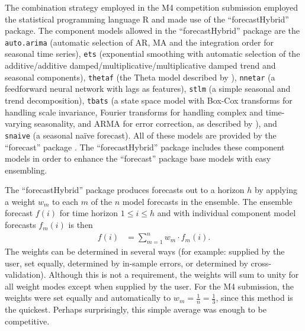\documentclass[11pt,3p,review,authoryear]{elsarticle}
\begin{document}
The combination strategy employed in the M4 competition submission employed the statistical programming language R \citep{Rlang} and made use of the ``forecastHybrid'' \citep{forecastHybrid} package. The component models allowed in the ``forecastHybrid'' package are the \texttt{auto.arima} (automatic selection of AR, MA and the integration order for seasonal time series), \texttt{ets} (exponential smoothing with automatic selection of the additive/additive damped/multiplicative/multiplicative damped trend and seasonal components), \texttt{thetaf} (the Theta model described by \citealp{THETA}), \texttt{nnetar} (a feedforward neural network with lags as features), \texttt{stlm} (a simple
seasonal and trend decomposition), \texttt{tbats} (a state space model with Box-Cox transforms for handling scale invariance, Fourier transforms for handling complex and time-varying seasonality, and ARMA for error correction, as described by \cite{TBATS}), and \texttt{snaive} (a seasonal na\"ive forecast). All of these models are provided by the ``forecast'' package \citep{Forecast}. The ``forecastHybrid'' package includes these component models in order to enhance the ``forecast'' package base models with easy ensembling.

The ``forecastHybrid'' package produces forecasts out to a horizon $h$ by applying a weight $w_m$ to each $m$ of the $n$ model forecasts in the ensemble. The ensemble forecast $f(i)$ for time horizon $1 \leq i \leq h$ and with individual component model forecasts $f_m(i)$ is then
\begin{align}
f(i) & = \sum_{m=1}^n w_m\cdot f_m(i).
\end{align}
The weights can be determined in several ways (for example: supplied by the user, set equally, determined by in-sample errors, or determined by cross-validation). Although this is not a requirement, the weights will sum to unity for all weight modes except when supplied by the user. For the M4 submission, the weights were set equally and automatically to $w_m = \frac{1}{n} = \frac{1}{3}$, since this method is the quickest. Perhaps surprisingly, this simple average was enough to be competitive.
\end{document}
